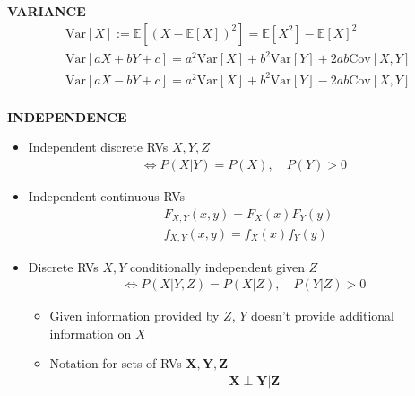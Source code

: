 \begin{whitebox}{\textbf{VARIANCE}}
    \begin{align*}
        &\mathrm{Var}[X]:=\mathbb{E}[(X-\mathbb{E}[X])^2]=\mathbb{E}[X^2]-\mathbb{E}[X]^2\\
        &\mathrm{Var}[aX+bY+c]=a^2\mathrm{Var}[X]+b^2\mathrm{Var}[Y]+2ab\mathrm{Cov}[X,Y]\\
        &\mathrm{Var}[aX-bY+c]=a^2\mathrm{Var}[X]+b^2\mathrm{Var}[Y]-2ab\mathrm{Cov}[X,Y]\\
    \end{align*}
\end{whitebox}

\begin{whitebox}{\textbf{INDEPENDENCE}}
    \begin{itemize}
        \item Independent discrete RVs $X,Y,Z$
        \begin{align*}
            \Longleftrightarrow P(X|Y)=P(X),\quad P(Y)>0
        \end{align*}
        \item Independent continuous RVs
        \begin{align*}
            &F_{X,Y}(x,y)=F_X(x)F_Y(y)\\
            &f_{X,Y}(x,y)=f_X(x)f_Y(y)
        \end{align*}
        \item Discrete RVs $X,Y$ conditionally independent given $Z$
        \begin{align*}
            \Longleftrightarrow P(X| Y,Z)=P(X| Z),\quad P(Y| Z)>0
        \end{align*}
        \begin{itemize}
            \item Given information provided by $Z$, $Y$ doesn't provide additional information on $X$
            \item Notation for sets of RVs $\bm{X,Y,Z}$
            \begin{align*}
                \bm{X}\perp \bm{Y}|\bm{Z}
            \end{align*}

        \end{itemize}
    \end{itemize}
\end{whitebox}

